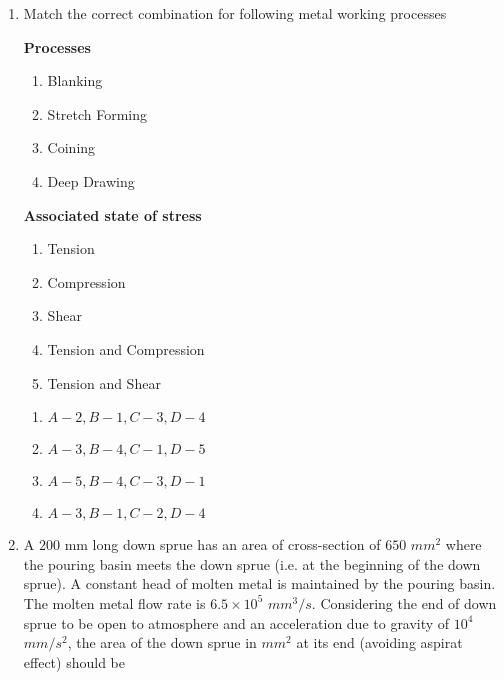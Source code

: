 \documentclass[journal]{IEEEtran}
\begin{document}
\begin{enumerate}[start = 52]
    \item Match the correct combination for following metal working processes
    \begin{multicols}{2}
			\textbf{Processes}
			\begin{enumerate}[label=(\Alph*)]
                
				\item Blanking
				\item Stretch Forming
                    \item Coining
                    \item Deep Drawing
			\end{enumerate}
			\columnbreak
			\textbf{Associated state of stress}
			\begin{enumerate}[label=(\arabic*)]
				\item Tension
				\item Compression
				\item Shear
                    \item Tension and Compression
                    \item Tension and Shear
			\end{enumerate}
		\end{multicols}

      \begin{multicols}{2}
        \begin{enumerate}
            \item $A-2,B-1,C-3,D-4$
            \item $A-3,B-4,C-1,D-5$
            \item $A-5,B-4,C-3,D-1$
            \item $A-3,B-1,C-2,D-4$
        \end{enumerate}
    \end{multicols}

    \item A $200$ mm long down sprue has an area of cross-section of $650$ $mm^2$ where the pouring basin meets the down sprue (i.e. at the beginning of the down sprue). A constant head of molten metal is maintained by the pouring basin. The molten metal flow rate is $6.5 \times 10^5$ $mm^{3}/s$. Considering the end of down sprue to be open to atmosphere and an acceleration due to gravity of $10^4$ $mm/s^2$, the area of the down sprue in $mm^2$ at its end (avoiding aspirat effect) should be
    \begin{figure}[!ht]
\centering
{}
\end{figure}
\end{enumerate}
\end{document}
